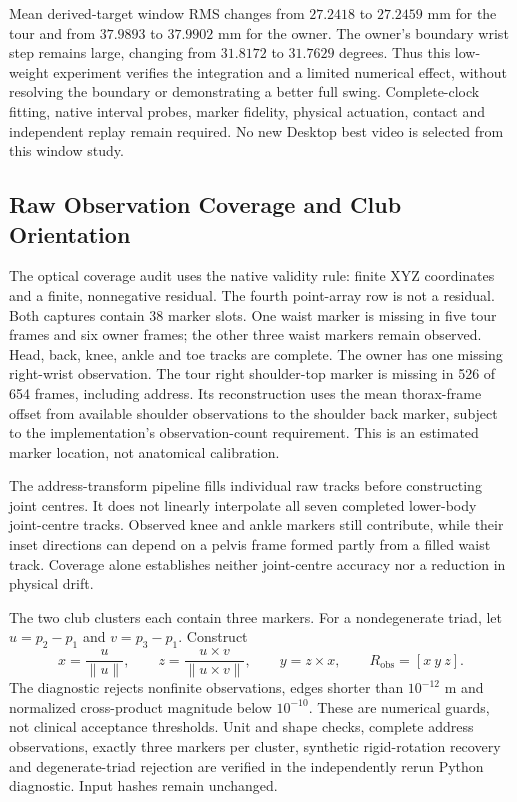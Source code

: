 \documentclass[11pt,a4paper]{article}
\begin{document}
Mean derived-target window RMS changes from $27.2418$ to $27.2459$ mm for
the tour and from $37.9893$ to $37.9902$ mm for the owner. The owner's
boundary wrist step remains large, changing from $31.8172$ to $31.7629$
degrees. Thus this low-weight experiment verifies the integration and a
limited numerical effect, without resolving the boundary or demonstrating
a better full swing. Complete-clock fitting, native interval probes,
marker fidelity, physical actuation, contact and independent replay remain
required. No new Desktop best video is selected from this window study.

\subsection{Raw Observation Coverage and Club Orientation}
The optical coverage audit uses the native validity rule: finite XYZ coordinates
and a finite, nonnegative residual. The fourth point-array row is not a
residual. Both captures contain 38 marker slots. One waist marker is missing
in five tour frames and six owner frames; the other three waist markers remain
observed. Head, back, knee, ankle and toe tracks are complete. The owner has
one missing right-wrist observation. The tour right shoulder-top marker is
missing in 526 of 654 frames, including address. Its reconstruction uses the
mean thorax-frame offset from available shoulder observations to the shoulder
back marker, subject to the implementation's observation-count requirement.
This is an estimated marker location, not anatomical calibration.

The address-transform pipeline fills individual raw tracks before constructing
joint centres. It does not linearly interpolate all seven completed lower-body
joint-centre tracks. Observed knee and ankle markers still contribute, while
their inset directions can depend on a pelvis frame formed partly from a
filled waist track. Coverage alone establishes neither joint-centre accuracy
nor a reduction in physical drift.

The two club clusters each contain three markers. For a nondegenerate triad,
let $u=p_2-p_1$ and $v=p_3-p_1$. Construct
\[
 x=\frac{u}{\|u\|},\qquad
 z=\frac{u\times v}{\|u\times v\|},\qquad
 y=z\times x,\qquad R_{\mathrm{obs}}=[x\ y\ z].
\]
The diagnostic rejects nonfinite observations, edges shorter than
$10^{-12}$ m and normalized cross-product magnitude below $10^{-10}$.
These are numerical guards, not clinical acceptance thresholds. Unit and
shape checks, complete address observations, exactly three markers per
cluster, synthetic rigid-rotation recovery and degenerate-triad rejection
are verified in the independently rerun Python diagnostic. Input hashes
remain unchanged.
\end{document}
